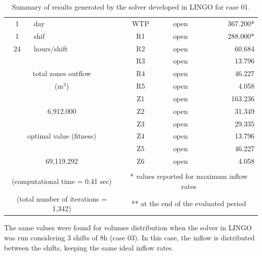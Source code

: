 \documentclass{singlecol}
\theoremstyle{TH}{
\newtheorem{lemma}{Lemma}
\newtheorem{theorem}[lemma]{Theorem}
\newtheorem{corrolary}[lemma]{Corrolary}
\newtheorem{conjecture}[lemma]{Conjecture}
\newtheorem{proposition}[lemma]{Proposition}
\newtheorem{claim}[lemma]{Claim}
\newtheorem{stheorem}[lemma]{Wrong Theorem}
\newtheorem{algorithm}{Algorithm}
}
\theoremstyle{THrm}{
\newtheorem{definition}{Definition}[section]
\newtheorem{question}{Question}[section]
\newtheorem{remark}{Remark}
\newtheorem{scheme}{Scheme}
}
\theoremstyle{THhit}{
\newtheorem{case}{Case}[section]
}
\begin{document}
\begin{table}[h!]
\begin{center}
\begin{small}
\begin{tabular}{ c r r r r r }
		   \\
1   &  \multicolumn{1}{l}{day} &  & \multicolumn{1}{c}{WTP} & \multicolumn{1}{c}{open} &  367.200* \\
1   &  \multicolumn{1}{l}{shif} & & \multicolumn{1}{c}{R1}  & \multicolumn{1}{c}{open} &  288.000* \\
24  &  \multicolumn{1}{l}{hours/shift} & & \multicolumn{1}{c}{R2} & \multicolumn{1}{c}{open} &   60.684\\
	&      &                  & \multicolumn{1}{c}{R3}     & \multicolumn{1}{c}{open} &    13.796 \\
\multicolumn{3}{c}{total zones outflow} & \multicolumn{1}{c}{R4} & \multicolumn{1}{c}{open}  &   46.227 \\
\multicolumn{3}{c}{($\mathrm{m^3}$)}& \multicolumn{1}{c}{R5}     & \multicolumn{1}{c}{open} &     4.058 \\
	   &      &              		& \multicolumn{1}{c}{Z1}     & \multicolumn{1}{c}{open} &   163.236 \\
\multicolumn{3}{c}{6,912.000}       & \multicolumn{1}{c}{Z2}     & \multicolumn{1}{c}{open} &    31.349 \\
	   &      &              		& \multicolumn{1}{c}{Z3}     & \multicolumn{1}{c}{open} &    29.335 \\\multicolumn{3}{c}{optimal value (fitness)} & \multicolumn{1}{c}{Z4} & \multicolumn{1}{c}{open} &13.796 \\
	   &      &             	    & \multicolumn{1}{c}{Z5}     & \multicolumn{1}{c}{open} &    46.227 \\
\multicolumn{3}{c}{69,119.292}       & \multicolumn{1}{c}{Z6}     & \multicolumn{1}{c}{open} &     4.058 \\\\
\multicolumn{3}{c}{(computational time  = 0.41 sec)}     & \multicolumn{3}{c}{* values reported for maximum inflow rates} \\
\multicolumn{3}{c}{(total number of iterations = 1,342)}   & \multicolumn{3}{c}{** at the end of the evaluated period} 
	\end{tabular}
\end{small}
\caption{Summary of results generated by the solver developed in LINGO for case 01.}
\label{tab:lingoEvalCase01}
\end{center}
\end{table}

The same values were found for volumes distribution when the solver in LINGO was run considering 3 shifts of 8h (case 03). In this case, the inflow is distributed between the shifts, keeping the same ideal inflow rates.
\end{document}
